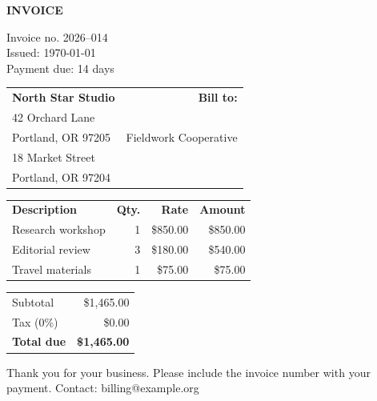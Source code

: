 \documentclass[a4paper]{article}
\begin{document}
\begin{flushright}
{\Huge\color{invoicegray}\bfseries INVOICE}\par\medskip
Invoice no. 2026--014\\
Issued: \today\\
Payment due: 14 days
\end{flushright}
\vspace{8mm}
\begin{tabularx}{\linewidth}{@{}Xr@{}}
\textbf{North Star Studio} & \textbf{Bill to:}\tabularnewline
42 Orchard Lane\\Portland, OR 97205 & Fieldwork Cooperative\\18 Market Street\\Portland, OR 97204
\end{tabularx}
\vspace{12mm}
\begin{tabularx}{\linewidth}{@{}Xrrr@{}}
\rowcolor{invoicegray}\color{white}\textbf{Description} & \color{white}\textbf{Qty.} & \color{white}\textbf{Rate} & \color{white}\textbf{Amount}\\
Research workshop & 1 & \$850.00 & \$850.00\\
Editorial review & 3 & \$180.00 & \$540.00\\
Travel materials & 1 & \$75.00 & \$75.00
\end{tabularx}
\vspace{7mm}
\begin{flushright}
\begin{tabular}{lr}
Subtotal & \$1,465.00\\
Tax (0\%) & \$0.00\\
\arrayrulecolor{invoicegray}\hline
\textbf{Total due} & \textbf{\$1,465.00}
\end{tabular}
\end{flushright}
\vfill
Thank you for your business. Please include the invoice number with your
payment. Contact: billing@example.org
\end{document}
